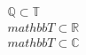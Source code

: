 \documentclass[preview]{standalone}
\begin{document}
\begin{align*}
\mathbb{Q} \subset \mathbb{T} \\mathbb{T} \subset \mathbb{R} \\mathbb{T} \subset \mathbb{C}
\end{align*}
\end{document}
